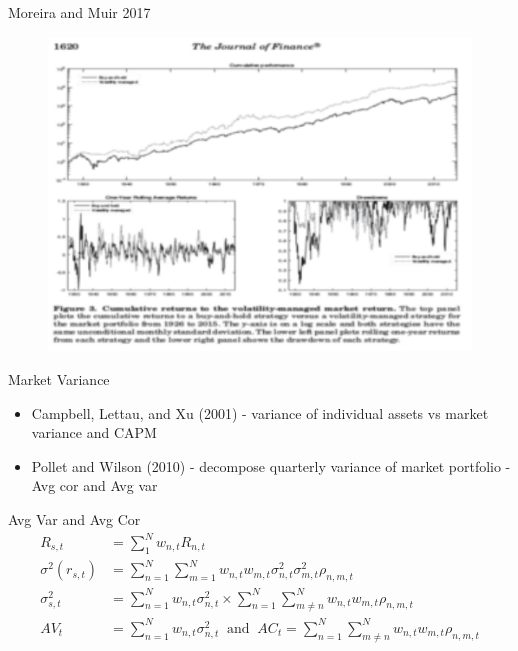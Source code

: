 \documentclass{beamer}
\begin{document}
\begin{frame}{Moreira and Muir 2017}
	\begin{figure}
			\includegraphics{mm}
	\end{figure}

\end{frame}

\begin{frame}
	\begin{block}{Market Variance}
		\begin{itemize}
			\item Campbell, Lettau, and Xu (2001) - variance of individual assets vs market variance and CAPM
			\item Pollet and Wilson (2010) - decompose quarterly variance of market portfolio - Avg cor and Avg var
		\end{itemize}
	\end{block}
	\begin{block}{Avg Var and Avg Cor}
		\vspace{-12pt}
		\begin{align*}
		R_{s,t} &= \sum_{1}^{N}w_{n,t}R_{n,t} \\
		\sigma^{2}(r_{s,t}) &= \sum_{n=1}^{N} \sum_{m=1}^{N}w_{n,t}w_{m,t}\sigma^{2}_{n,t}\sigma^{2}_{m,t}\rho_{n,m,t}\\
		\sigma^{2}_{s,t} &= \sum_{n=1}^{N} w_{n,t}\sigma^{2}_{n,t} \times \sum_{n=1}^{N}\sum_{m \neq n}^{N}w_{n,t}w_{m,t}\rho_{n,m,t}\\
		AV_{t} &= \sum_{n=1}^{N} w_{n,t}\sigma^{2}_{n,t} ~ \text{ and } ~ AC_{t} = \sum_{n=1}^{N}\sum_{m \neq n}^{N}w_{n,t}w_{m,t}\rho_{n,m,t}
		\end{align*}
	\end{block}
\end{frame}
\end{document}
